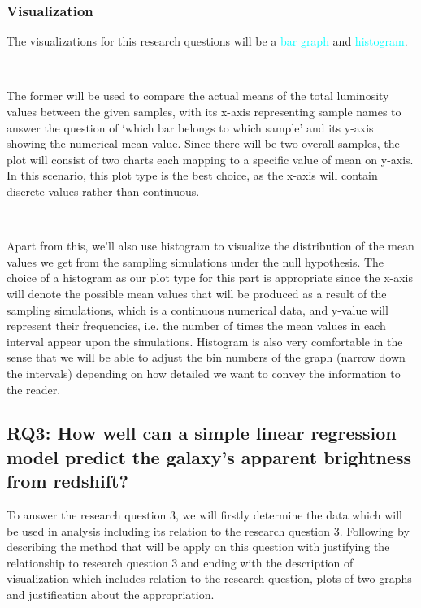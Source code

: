 \documentclass[12pt]{article}
\begin{document}
\subsubsection{Visualization}

The visualizations for this research questions will be a \textcolor{cyan}{bar graph} and \textcolor{cyan}{histogram}. 

\

\noindent The former will be used to compare the actual means of the total luminosity values between the given samples, with its x-axis representing sample names to answer the question of `which bar belongs to which sample' and its y-axis showing the numerical mean value. Since there will be two overall samples, the plot will consist of two charts each mapping to a specific value of mean on y-axis. In this scenario, this plot type is the best choice, as the x-axis will contain discrete values rather than continuous. 

\

\noindent Apart from this, we'll also use histogram to visualize the distribution of the mean values we get from the sampling simulations under the null hypothesis. The choice of a histogram as our plot type for this part is appropriate since the x-axis will denote the possible mean values that will be produced as a result of the sampling simulations, which is a continuous numerical data, and y-value will represent their frequencies, i.e. the number of times the mean values in each interval appear upon the simulations. Histogram is also very comfortable in the sense that we will be able to adjust the bin numbers of the graph (narrow down the intervals) depending on how detailed we want to convey the information to the reader.

\newpage

\subsection{RQ3: How well can a simple linear regression model predict the galaxy's apparent brightness from redshift?}

To answer the research question 3, we will firstly determine the data which will be used in analysis including its relation to the research question 3. Following by describing the method that will be apply on this question with justifying the relationship to research question 3 and ending with the description of visualization which includes relation to the research question, plots of two graphs and justification about the appropriation. 
\end{document}
